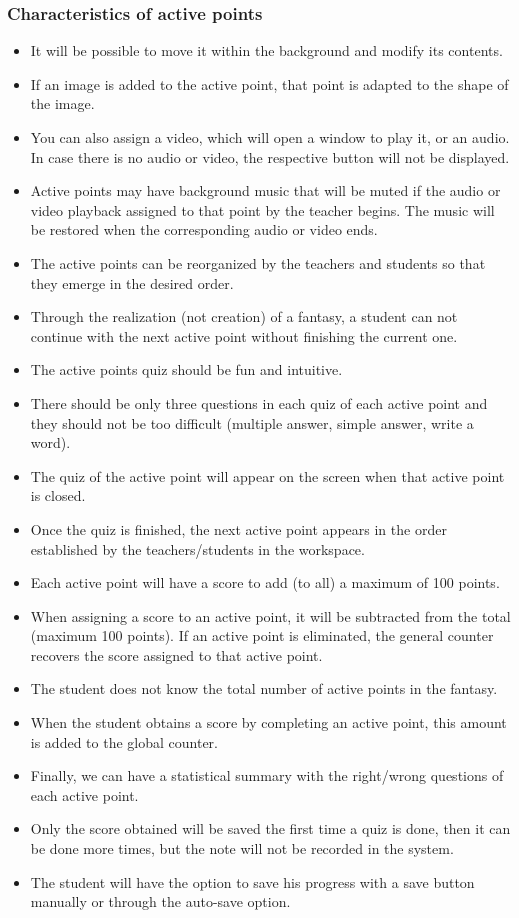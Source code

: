 \subsubsection{Characteristics of active points}
\begin{itemize}
	\item It will be possible to move it within the background and modify its contents.
	\item If an image is added to the active point, that point is adapted to the shape of the image.
	\item You can also assign a video, which will open a window to play it, or an audio. In case there is no audio or video, the respective button will not be displayed.
	\item Active points may have background music that will be muted if the audio or video playback assigned to that point by the teacher begins. The music will be restored when the corresponding audio or video ends.
	\item The active points can be reorganized by the teachers and students so that they emerge in the desired order.
	\item Through the realization (not creation) of a fantasy, a student can not continue with the next active point without finishing the current one.
	\item The active points quiz should be fun and intuitive.
	\item There should be only three questions in each quiz of each active point and they should not be too difficult (multiple answer, simple answer, write a word).
	\item The quiz of the active point will appear on the screen when that active point is closed.
	\item Once the quiz is finished, the next active point appears in the order established by the teachers/students in the workspace.
	\item Each active point will have a score to add (to all) a maximum of 100 points.
	\item When assigning a score to an active point, it will be subtracted from the total (maximum 100 points). If an active point is eliminated, the general counter recovers the score assigned to that active point.
	\item The student does not know the total number of active points in the fantasy.
	\item When the student obtains a score by completing an active point, this amount is added to the global counter.
	\item Finally, we can have a statistical summary with the right/wrong questions of each active point.
	\item Only the score obtained will be saved the first time a quiz is done, then it can be done more times, but the note will not be recorded in the system.
	\item The student will have the option to save his progress with a save button manually or through the auto-save option.
\end{itemize}


